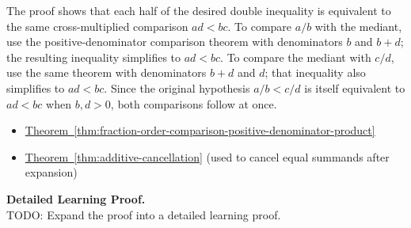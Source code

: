 \begin{remark*}
The proof shows that each half of the desired double inequality is equivalent
to the same cross-multiplied comparison $ad<bc$.  To compare $a/b$ with the
mediant, use the positive-denominator comparison theorem with denominators
$b$ and $b+d$; the resulting inequality simplifies to $ad<bc$.  To compare
the mediant with $c/d$, use the same theorem with denominators $b+d$ and $d$;
that inequality also simplifies to $ad<bc$.  Since the original hypothesis
$a/b<c/d$ is itself equivalent to $ad<bc$ when $b,d>0$, both comparisons
follow at once.
\end{remark*}

\begin{dependencies}
\begin{itemize}
  \item \hyperref[thm:fraction-order-comparison-positive-denominator-product]{Theorem~\ref*{thm:fraction-order-comparison-positive-denominator-product}}
  \item \hyperref[thm:additive-cancellation]{Theorem~\ref*{thm:additive-cancellation}}
        \textnormal{(used to cancel equal summands after expansion)}
\end{itemize}
\end{dependencies}

\textbf{Detailed Learning Proof.}~\\
TODO: Expand the proof into a detailed learning proof.

